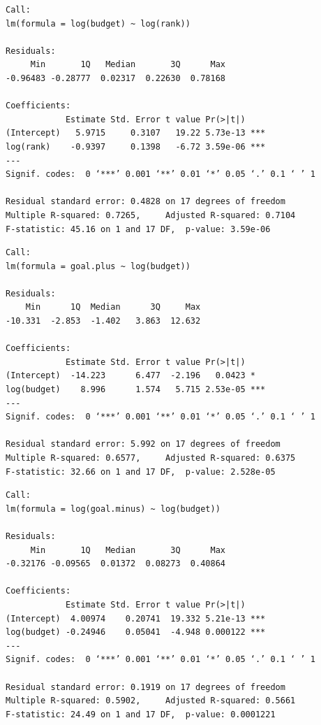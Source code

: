 \begin{lstlisting}[caption=予算額とリーグ戦順位, label=code:予算額とリーグ戦順位]
Call:
lm(formula = log(budget) ~ log(rank))

Residuals:
     Min       1Q   Median       3Q      Max 
-0.96483 -0.28777  0.02317  0.22630  0.78168 

Coefficients:
            Estimate Std. Error t value Pr(>|t|)    
(Intercept)   5.9715     0.3107   19.22 5.73e-13 ***
log(rank)    -0.9397     0.1398   -6.72 3.59e-06 ***
---
Signif. codes:  0 ‘***’ 0.001 ‘**’ 0.01 ‘*’ 0.05 ‘.’ 0.1 ‘ ’ 1 

Residual standard error: 0.4828 on 17 degrees of freedom
Multiple R-squared: 0.7265,     Adjusted R-squared: 0.7104 
F-statistic: 45.16 on 1 and 17 DF,  p-value: 3.59e-06 
\end{lstlisting}

\begin{lstlisting}[caption=予算額と得点, label=code:予算額と得点]
Call:
lm(formula = goal.plus ~ log(budget))

Residuals:
    Min      1Q  Median      3Q     Max 
-10.331  -2.853  -1.402   3.863  12.632 

Coefficients:
            Estimate Std. Error t value Pr(>|t|)    
(Intercept)  -14.223      6.477  -2.196   0.0423 *  
log(budget)    8.996      1.574   5.715 2.53e-05 ***
---
Signif. codes:  0 ‘***’ 0.001 ‘**’ 0.01 ‘*’ 0.05 ‘.’ 0.1 ‘ ’ 1 

Residual standard error: 5.992 on 17 degrees of freedom
Multiple R-squared: 0.6577,     Adjusted R-squared: 0.6375 
F-statistic: 32.66 on 1 and 17 DF,  p-value: 2.528e-05
\end{lstlisting}

\begin{lstlisting}[caption=予算額と失点, label=code:予算額と失点]
Call:
lm(formula = log(goal.minus) ~ log(budget))

Residuals:
     Min       1Q   Median       3Q      Max 
-0.32176 -0.09565  0.01372  0.08273  0.40864 

Coefficients:
            Estimate Std. Error t value Pr(>|t|)    
(Intercept)  4.00974    0.20741  19.332 5.21e-13 ***
log(budget) -0.24946    0.05041  -4.948 0.000122 ***
---
Signif. codes:  0 ‘***’ 0.001 ‘**’ 0.01 ‘*’ 0.05 ‘.’ 0.1 ‘ ’ 1 

Residual standard error: 0.1919 on 17 degrees of freedom
Multiple R-squared: 0.5902,     Adjusted R-squared: 0.5661 
F-statistic: 24.49 on 1 and 17 DF,  p-value: 0.0001221 
\end{lstlisting}

